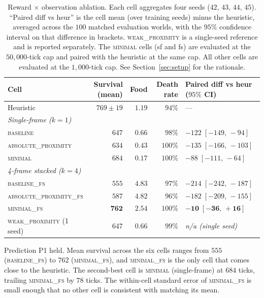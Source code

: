 \documentclass[12pt,a4paper,titlepage]{article}
\begin{document}
\begin{table}[!ht]
\centering
\caption{Reward $\times$ observation ablation. Each cell aggregates four seeds ($42$, $43$, $44$, $45$). ``Paired diff vs heur'' is the cell mean (over training seeds) minus the heuristic, averaged across the $100$ matched evaluation worlds, with the $95\%$ confidence interval on that difference in brackets. \textsc{weak\_proximity} is a single-seed reference and is reported separately. The \textsc{minimal} cells (sf and fs) are evaluated at the $50{,}000$-tick cap and paired with the heuristic at the same cap. All other cells are evaluated at the $1{,}000$-tick cap. See Section~\ref{sec:setup} for the rationale.}

\label{tab:cell_results}
\footnotesize
\setlength{\tabcolsep}{4pt}
\begin{tabular}{lrrrl}
\toprule
Cell & Survival (mean) & Food & Death rate & Paired diff vs heur ($95\%$ CI) \\
\midrule
Heuristic                          & $769 \pm 19$       & $1.19$ & $94\%$  & --- \\
\midrule
\multicolumn{5}{l}{\textit{Single-frame ($k=1$)}} \\
\textsc{baseline}                  & $647$              & $0.66$ & $98\%$  & $-122\;[-149,\,-94]$ \\
\textsc{absolute\_proximity}       & $634$              & $0.43$ & $100\%$ & $-135\;[-166,\,-103]$ \\
\textsc{minimal}                   & $684$              & $0.17$ & $100\%$ & $-88\;[-111,\,-64]$ \\
\midrule
\multicolumn{5}{l}{\textit{4-frame stacked ($k=4$)}} \\
\textsc{baseline\_fs}              & $555$              & $4.83$ & $97\%$  & $-214\;[-242,\,-187]$ \\
\textsc{absolute\_proximity\_fs}   & $587$              & $4.82$ & $96\%$  & $-182\;[-209,\,-155]$ \\
\textsc{minimal\_fs}               & $\mathbf{762}$     & $2.54$ & $100\%$ & $\mathbf{-10\;[-36,\,+16]}$ \\
\midrule
\textsc{weak\_proximity} (1 seed)  & $647$              & $0.66$ & $99\%$  & \textit{n/a (single seed)} \\
\bottomrule
\end{tabular}
\end{table}

Prediction P1 held. Mean survival across the six cells ranges from $555$ (\textsc{baseline\_fs}) to $762$ (\textsc{minimal\_fs}), and \textsc{minimal\_fs} is the only cell that comes close to the heuristic. The second-best cell is \textsc{minimal} (single-frame) at $684$ ticks, trailing \textsc{minimal\_fs} by $78$ ticks. The within-cell standard error of \textsc{minimal\_fs} is small enough that no other cell is consistent with matching its mean.
\end{document}
